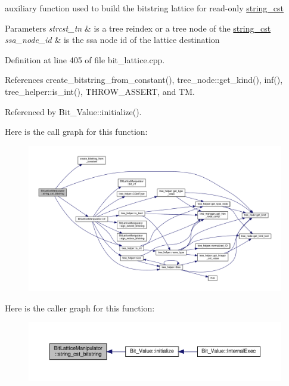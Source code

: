 auxiliary function used to build the bitstring lattice for read-\/only \hyperlink{structstring__cst}{string\+\_\+cst} 


\begin{DoxyParams}{Parameters}
{\em strcst\+\_\+tn} & is a tree reindex or a tree node of the \hyperlink{structstring__cst}{string\+\_\+cst} \\
\hline
{\em ssa\+\_\+node\+\_\+id} & is the ssa node id of the lattice destination \\
\hline
\end{DoxyParams}


Definition at line 405 of file bit\+\_\+lattice.\+cpp.



References create\+\_\+bitstring\+\_\+from\+\_\+constant(), tree\+\_\+node\+::get\+\_\+kind(), inf(), tree\+\_\+helper\+::is\+\_\+int(), T\+H\+R\+O\+W\+\_\+\+A\+S\+S\+E\+RT, and TM.



Referenced by Bit\+\_\+\+Value\+::initialize().

Here is the call graph for this function\+:
\nopagebreak
\begin{figure}[H]
\begin{center}
\leavevmode
\includegraphics[width=350pt]{dd/d98/classBitLatticeManipulator_a0880fc86301b0fbd131c668d79819e78_cgraph}
\end{center}
\end{figure}
Here is the caller graph for this function\+:
\nopagebreak
\begin{figure}[H]
\begin{center}
\leavevmode
\includegraphics[width=350pt]{dd/d98/classBitLatticeManipulator_a0880fc86301b0fbd131c668d79819e78_icgraph}
\end{center}
\end{figure}
\mbox{\label{classBitLatticeManipulator_a83eec7b71ec09cf4f2102efaaef3a1ad}} 
